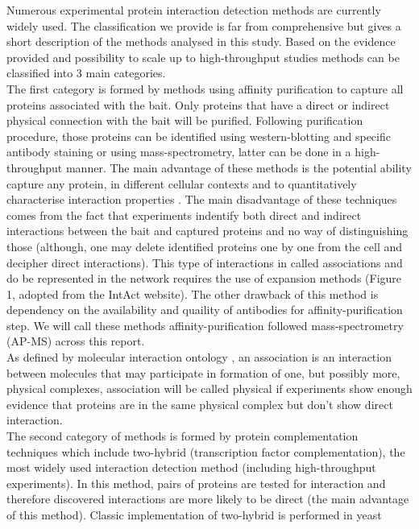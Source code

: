 \documentclass[12pt,]{report}
\begin{document}
Numerous experimental protein interaction detection methods are
currently widely used. The classification we provide is far from
comprehensive but gives a short description of the methods analysed in
this study. Based on the evidence provided and possibility to scale up
to high-throughput studies methods can be classified into 3 main
categories.\\
The first category is formed by methods using affinity purification to
capture all proteins associated with the bait. Only proteins that have a
direct or indirect physical connection with the bait will be purified.
Following purification procedure, those proteins can be identified using
western-blotting and specific antibody staining or using
mass-spectrometry, latter can be done in a high-throughput manner. The
main advantage of these methods is the potential ability capture any
protein, in different cellular contexts and to quantitatively
characterise interaction properties \citep{Hein:2015aa}. The main
disadvantage of these techniques comes from the fact that experiments
indentify both direct and indirect interactions between the bait and
captured proteins and no way of distinguishing those (although, one may
delete identified proteins one by one from the cell and decipher direct
interactions). This type of interactions in called associations and do
be represented in the network requires the use of expansion methods
(Figure 1, adopted from the IntAct website). The other drawback of this
method is dependency on the availability and quaility of antibodies for
affinity-purification step. We will call these methods
affinity-purification followed mass-spectrometry (AP-MS) across this
report.\\
As defined by molecular interaction ontology
\citep[\url{http://www.ebi.ac.uk/ols/ontologies/mi/}]{Hermjakob:2004aa},
an association is an interaction between molecules that may participate
in formation of one, but possibly more, physical complexes, association
will be called physical if experiments show enough evidence that
proteins are in the same physical complex but don't show direct
interaction.\\
The second category of methods is formed by protein complementation
techniques which include two-hybrid (transcription factor
complementation), the most widely used interaction detection method
(including high-throughput experiments). In this method, pairs of
proteins are tested for interaction and therefore discovered
interactions are more likely to be direct (the main advantage of this
method). Classic implementation of two-hybrid is performed in yeast
\end{document}
